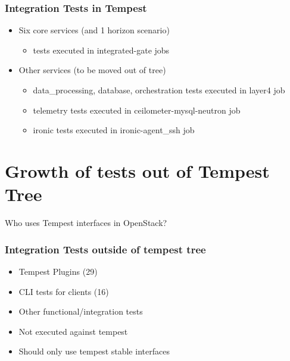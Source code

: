 \documentclass[aspectratio=169,11pt,hyperref={colorlinks=true}]{beamer}
\begin{document}
\begin{frame}
    \frametitle{Integration Tests in Tempest}
    \begin{itemize}
        \item{Six core services (and 1 horizon scenario)}
            \begin{itemize}
                \item{tests executed in integrated-gate jobs}
            \end{itemize}
        \item{Other services (to be moved out of tree)}
            \begin{itemize}
                \item{data\_processing, database, orchestration tests executed in layer4 job}
                \item{telemetry tests executed in ceilometer-mysql-neutron job}
                \item{ironic tests executed in ironic-agent\_ssh job}
            \end{itemize}
    \end{itemize}
\end{frame}

\section{Growth of tests out of Tempest Tree}
\begin{frame}[c]
    \begin{center}
        \large Who uses Tempest interfaces in OpenStack?
    \end{center}
\end{frame}

\begin{frame}
    \frametitle{Integration Tests outside of tempest tree}
    \begin{itemize}
        \item{Tempest Plugins (29)}
        \item{CLI tests for clients (16)}
        \item{Other functional/integration tests}
    \end{itemize}
    \begin{itemize}
        \item{Not executed against tempest}
        \item{Should only use tempest stable interfaces}
    \end{itemize}
\end{frame}
\end{document}
